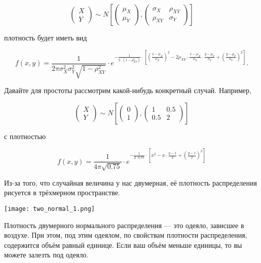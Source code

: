 \[ 
\begin{pmatrix}
X \\
Y
\end{pmatrix} \sim N \left[ 
\begin{pmatrix}
\mu_X \\
\mu_Y
\end{pmatrix} ,
\begin{pmatrix}
\sigma_X & \rho_{XY} \\
 \rho_{XY}  & \sigma_Y
\end{pmatrix} 
\right]
\]

плотность будет иметь вид

\[
f(x,y) = \frac{1}{2 \pi \sigma_X^2 \sigma_Y^2  \sqrt{1 - \rho_{XY}^2}} \cdot e^{-\frac{1}{2 \cdot (1 - \rho^2_{XY})} \cdot \left[ \left(  \frac{x - \mu_X}{\sigma_X}  \right)^2 - 2 \rho_{XY} \cdot \frac{x - \mu_X}{\sigma_X} \cdot \frac{y - \mu_Y}{\sigma_Y} + \left( \frac{y - \mu_Y}{\sigma_Y}    \right)^2   \right]}.
\]

Давайте для простоты рассмотрим какой-нибудь конкретный случай. Например, 

\[ 
\begin{pmatrix}
X \\
Y
\end{pmatrix} \sim N \left[
\begin{pmatrix}
0 \\
1
\end{pmatrix} ,
\begin{pmatrix}
1 & 0.5 \\
0.5  & 2
\end{pmatrix} 
\right]
\]

с плотностью 

\[
f(x,y) = \frac{1}{4 \pi \sqrt{0.75}} \cdot e^{-\frac{1}{2 \cdot 0.75} \cdot \left[ x^2 - x \cdot \frac{y - 1}{2} + \left( \frac{y - 1}{2}    \right)^2   \right]}
\]

Из-за того, что случайная величина у нас двумерная, её плотность распределения рисуется в трёхмерном пространстве. 

\begin{center}
\texttt{[image: two\_normal\_1.png]}
\end{center}

Плотность двумерного нормального распределения --- это одеяло, зависшее в воздухе. При этом, под этим одеялом, по свойствам плотности распределения,  содержится объём равный единице. Если ваш объём меньше единицы, то вы можете залезть под одеяло. 


